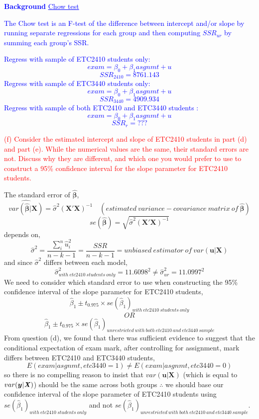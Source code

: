 \documentclass[12pt]{report}
\newenvironment{blueframed}[1][blue]
{\def\FrameCommand{\fboxsep=\FrameSep\fcolorbox{#1}{white}}%
	\MakeFramed {\advance\hsize-\width \FrameRestore}}
{\endMakeFramed}
\begin{document}
\justify
\begin{blueframed}
	\textcolor{blue}{\textbf{Background}}
	\vspace{-\baselineskip}
	\justify
	\textcolor{blue}{\underline{Chow test}}
	
	\noindent \textcolor{blue}
	{
		The Chow test is an F-test of the difference between intercept and/or slope by running separate regressions for each group and then computing $SSR_{ur}$ by summing each group's SSR.
	}

	\noindent \textcolor{blue}
	{
		Regress with sample of ETC2410 students only:
		$$exam = \beta_0 + \beta_1asgnmt + u$$
		$$SSR_{2410} = 8761.143$$
		Regress with sample of ETC3440 students only:
		$$exam = \beta_0 + \beta_1asgnmt + u$$
		$$SSR_{3440} = 4909.934$$
		Regress with sample of both ETC2410 and ETC3440 students :
		$$exam = \beta_0 + \beta_1asgnmt + u$$
		$$SSR_{r} = ???$$
	}
\end{blueframed}

\newpage
\noindent \textcolor{red}{(f) Consider the estimated intercept and slope of ETC2410 students in part (d) and part (e). While the numerical values are the same, their standard errors are not. Discuss why they are different, and which one you would prefer to use to construct a 95\% confidence interval for the slope parameter for ETC2410 students.}

\noindent The standard error of $\boldsymbol{\hat{\beta}}$,
$$\widehat{var({\boldsymbol{\hat{\beta}}|\boldsymbol{X}})} = \hat{\sigma}^2(\boldsymbol{X'X})^{-1} \quad (estimated\ variance-covariance\ matrix\ of\ \boldsymbol{\hat{\beta}})$$
$$se(\boldsymbol{\hat{\beta}}) = \sqrt{\hat{\sigma}^2(\boldsymbol{X'X})^{-1}}$$
\noindent depends on,
$$\hat{\sigma}^2 = \dfrac{\sum_{i}^{n}\hat{u}_{i}^{2}}{n-k-1} = \dfrac{SSR}{n-k-1} = unbiased\ estimator\ of\ var(\boldsymbol{u}|\boldsymbol{X})$$
and since $\hat{\sigma}^2$ differs between each model,
$$\hat{\sigma}^2_{with\ etc2410\ students\ only} = 11.6098^2 \neq \hat{\sigma}^2_{ur} = 11.0997^2$$
\noindent We need to consider which standard error to use when constructing the 95\% confidence interval of the slope parameter for ETC2410 students,
$$\hat{\beta}_1 \pm t_{0.975} \times se(\hat{\beta}_1)_{with\ etc2410\ students\ only}$$
$$OR$$
$$\hat{\beta}_1 \pm t_{0.975} \times se(\hat{\beta}_1)_{unrestricted\ with\ both\ etc2410\ and\ etc3440\ sample}$$
\noindent From question (d), we found that there was sufficient evidence to suggest that the conditional expectation of exam mark, after controlling for assignment, mark differs between ETC2410 and ETC3440 students, $$E(exam|asgnmt, etc3440=1) \neq E(exam|asgnmt, etc3440=0) $$ so there is no compelling reason to insist that $var(\boldsymbol{u}|\boldsymbol{X})$ (which is equal to $var(\boldsymbol{y}|\textbf{\textit{X}})$) should be the same across both groups $\therefore$ we should base our confidence interval of the slope parameter of ETC2410 students using $se(\hat{\beta}_1)_{with\ etc2410\ students\ only}$ and not $se(\hat{\beta}_1)_{unrestricted\ with\ both\ etc2410\ and\ etc3440\ sample}$.
\end{document}
